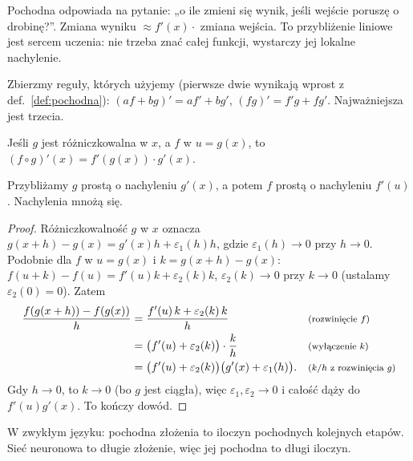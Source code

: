 \begin{intuicja}
Pochodna odpowiada na pytanie: „o ile zmieni się wynik, jeśli wejście poruszę o drobinę?”. Zmiana wyniku $\approx f'(x)\cdot$ zmiana wejścia.
To przybliżenie liniowe jest sercem uczenia: nie trzeba znać całej funkcji, wystarczy jej lokalne nachylenie.
\end{intuicja}

Zbierzmy reguły, których użyjemy (pierwsze dwie wynikają wprost z def.~\ref{def:pochodna}):
$(af+bg)'=af'+bg'$, $(fg)'=f'g+fg'$. Najważniejsza jest trzecia.

\begin{twierdzenie}\label{tw:lancuchowa}
Jeśli $g$ jest różniczkowalna w $x$, a $f$ w $u=g(x)$, to $(f\circ g)'(x)=f'(g(x))\cdot g'(x)$.
\end{twierdzenie}
\begin{pomyslDowodu}
Przybliżamy $g$ prostą o nachyleniu $g'(x)$, a potem $f$ prostą o nachyleniu $f'(u)$. Nachylenia mnożą się.
\end{pomyslDowodu}
\begin{proof}
Różniczkowalność $g$ w $x$ oznacza $g(x+h)-g(x)=g'(x)h+\varepsilon_1(h)h$, gdzie $\varepsilon_1(h)\to0$ przy $h\to0$. Podobnie dla $f$ w $u=g(x)$ i $k=g(x+h)-g(x)$:
$f(u+k)-f(u)=f'(u)k+\varepsilon_2(k)k$, $\varepsilon_2(k)\to0$ przy $k\to0$ (ustalamy $\varepsilon_2(0)=0$). Zatem
\begin{align*}
\frac{f(g(x+h))-f(g(x))}{h} &= \frac{f'(u)\,k+\varepsilon_2(k)\,k}{h} && \text{\footnotesize (rozwinięcie $f$)}\\
 &= \big(f'(u)+\varepsilon_2(k)\big)\cdot\frac{k}{h} && \text{\footnotesize (wyłączenie $k$)}\\
 &= \big(f'(u)+\varepsilon_2(k)\big)\big(g'(x)+\varepsilon_1(h)\big). && \text{\footnotesize ($k/h$ z rozwinięcia $g$)}
\end{align*}
Gdy $h\to0$, to $k\to0$ (bo $g$ jest ciągła), więc $\varepsilon_1,\varepsilon_2\to0$ i całość dąży do $f'(u)g'(x)$. To kończy dowód.
\end{proof}

W zwykłym języku: pochodna złożenia to iloczyn pochodnych kolejnych etapów. Sieć neuronowa to długie złożenie, więc jej pochodna to długi iloczyn.

